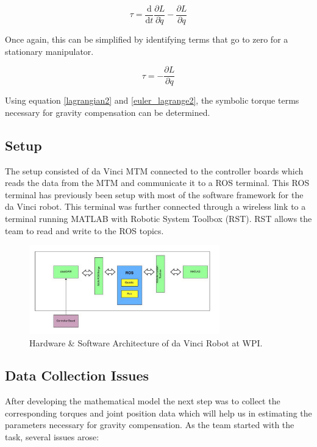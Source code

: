 \documentclass[conference]{IEEEtran}
\begin{document}
\begin{equation}
\label{euler_lagrange}
\tau = \frac{\mathrm{d}}{\mathrm{d}{t}}\frac{\partial L}{\partial \dot{q}} - \frac{\partial L}{\partial q}
\end{equation}

Once again, this can be simplified by identifying terms that go to zero for a stationary manipulator.

\begin{equation}
\label{euler_lagrange2}
\tau = - \frac{\partial L}{\partial q}
\end{equation}

Using equation \ref{lagrangian2} and \ref{euler_lagrange2}, the symbolic torque terms necessary for gravity compensation can be determined.

\subsection{Setup}
The setup consisted of da Vinci MTM connected to the controller boards which reads the data from the MTM and communicate it to a ROS terminal. This ROS terminal has previously been setup with most of the software framework for the da Vinci robot. This terminal was further connected through a wireless link to a terminal running MATLAB with Robotic System Toolbox (RST). RST allows the team to read and write to the ROS topics. 

\begin{figure}[!t]
\centering
\includegraphics[width=3.25in]{setup}
\caption{Hardware \& Software Architecture of da Vinci Robot at WPI.}
\label{hardware_setup}
\end{figure}

\subsection{Data Collection Issues}
After developing the mathematical model the next step was to collect the corresponding torques and joint position data which will help us in estimating the parameters necessary for gravity compensation. As the team started with the task, several issues arose:
\end{document}
